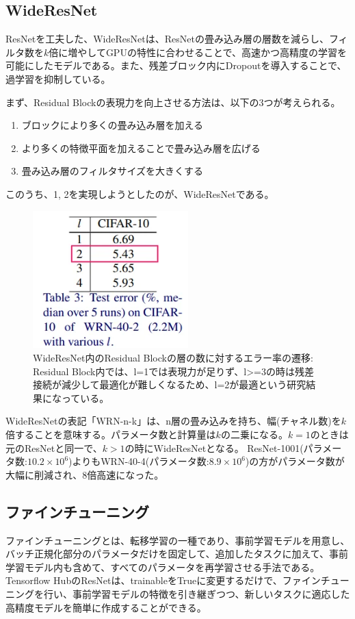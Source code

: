 \documentclass{ltjsarticle}
\begin{document}
\subsection{WideResNet}
ResNetを工夫した、WideResNetは、ResNetの畳み込み層の層数を減らし、フィルタ数を$k$倍に増やしてGPUの特性に合わせることで、高速かつ高精度の学習を可能にしたモデルである。また、残差ブロック内にDropoutを導入することで、過学習を抑制している。
\par
まず、Residual Blockの表現力を向上させる方法は、以下の3つが考えられる。
\begin{enumerate}
  \item ブロックにより多くの畳み込み層を加える
  \item より多くの特徴平面を加えることで畳み込み層を広げる
  \item 畳み込み層のフィルタサイズを大きくする
\end{enumerate}
このうち、1, 2を実現しようとしたのが、WideResNetである。
\begin{figure}
  \centering
  \includegraphics[width=6cm]{./capture/WideResNet.png}
  \caption{WideResNet内のResidual Blockの層の数に対するエラー率の遷移: Residual Block内では、l=1では表現力が足りず、l>=3の時は残差接続が減少して最適化が難しくなるため、l=2が最適という研究結果になっている。}
\end{figure}
WideResNetの表記「WRN-n-k」は、n層の畳み込みを持ち、幅(チャネル数)を$k$倍することを意味する。パラメータ数と計算量は$k$の二乗になる。$k=1$のときは元のResNetと同一で、$k>1$の時にWideResNetとなる。
ResNet-1001(パラメータ数:$10.2\times 10^6$)よりもWRN-40-4(パラメータ数:$8.9\times 10^6$)の方がパラメータ数が大幅に削減され、8倍高速になった。


\subsection{ファインチューニング}
ファインチューニングとは、転移学習の一種であり、事前学習モデルを用意し、バッチ正規化部分のパラメータだけを固定して、追加したタスクに加えて、事前学習モデル内も含めて、すべてのパラメータを再学習させる手法である。Tensorflow HubのResNetは、trainableをTrueに変更するだけで、ファインチューニングを行い、事前学習モデルの特徴を引き継ぎつつ、新しいタスクに適応した高精度モデルを簡単に作成することができる。
\end{document}
